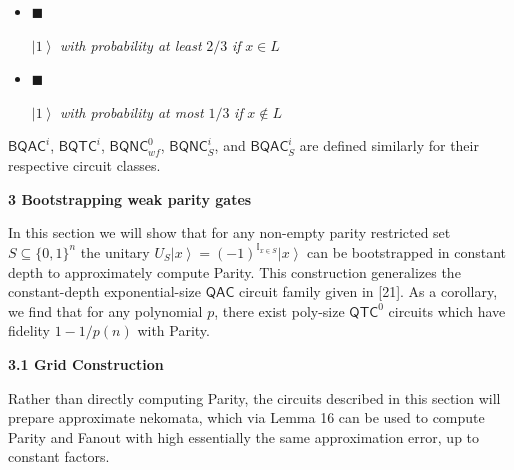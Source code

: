 \begin{itemize}


\item[] 
$\blacksquare$ 


$\left|1\right\rangle$\emph{ with probability at least }$2/3$\emph{ if }$x\in L$\emph{}\par





\item[] 
$\blacksquare$ 


$\left|1\right\rangle$\emph{ with probability at most }$1/3$\emph{ if }$x\not\in L$\emph{}\par





\end{itemize}






${\mathsf{BQAC}}^{i}$, ${\mathsf{BQTC}}^{i}$, ${\mathsf{BQNC}}^{0}_{wf}$, ${\mathsf{BQNC}}^{i}_{S}$, and ${\mathsf{BQAC}}^{i}_{S}$ are defined similarly for their respective circuit classes.\par






\par\medskip\noindent\textbf{
3 Bootstrapping weak parity gates}\par




In this section we will show that for any non-empty parity restricted set $S\subseteq\{0,1\}^{n}$ the unitary $U_{S}\left|x\right\rangle=(-1)^{\mathbb{I}_{x\in S}}\left|x\right\rangle$ can be bootstrapped in constant depth to approximately compute Parity. This construction generalizes the constant-depth exponential-size ${\mathsf{QAC}}$ circuit family given in [21]. As a corollary, we find that for any polynomial $p$, there exist poly-size ${\mathsf{QTC}}^{0}$ circuits which have fidelity $1-1/p(n)$ with Parity.\par




\par\medskip\noindent\textbf{
3.1 Grid Construction}\par




Rather than directly computing Parity, the circuits described in this section will prepare approximate nekomata, which via Lemma 16 can be used to compute Parity and Fanout with high essentially the same approximation error, up to constant factors.\par




